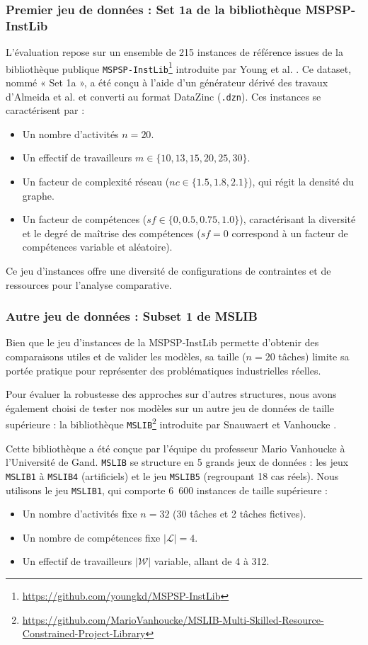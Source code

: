 \subsubsection{Premier jeu de données : Set 1a de la bibliothèque MSPSP-InstLib}
L'évaluation repose sur un ensemble de 215 instances de référence issues de la bibliothèque publique \texttt{MSPSP-InstLib}\footnote{\url{https://github.com/youngkd/MSPSP-InstLib}} introduite par Young et al. \cite{young2017constraint}. Ce dataset, nommé « Set 1a », a été conçu à l'aide d'un générateur dérivé des travaux d'Almeida et al. \cite{almeida2019modeling} et converti au format DataZinc (\texttt{.dzn}). Ces instances se caractérisent par :
\begin{itemize}
    \item Un nombre d'activités $n = 20$.
    \item Un effectif de travailleurs $m \in \{10, 13, 15, 20, 25, 30\}$.
    \item Un facteur de complexité réseau ($nc \in \{1.5, 1.8, 2.1\}$), qui régit la densité du graphe.
    \item Un facteur de compétences ($sf \in \{0, 0.5, 0.75, 1.0\}$), caractérisant la diversité et le degré de maîtrise des compétences ($sf=0$ correspond à un facteur de compétences variable et aléatoire).
\end{itemize}
Ce jeu d'instances offre une diversité de configurations de contraintes et de ressources pour l'analyse comparative.

\subsubsection{Autre jeu de données : Subset 1 de MSLIB}

Bien que le jeu d'instances de la MSPSP-InstLib permette d'obtenir des comparaisons utiles et de valider les modèles, sa taille ($n = 20$ tâches) limite sa portée pratique pour représenter des problématiques industrielles réelles.

Pour évaluer la robustesse des approches sur d'autres structures, nous avons également choisi de tester nos modèles sur un autre jeu de données de taille supérieure : la bibliothèque \texttt{MSLIB}\footnote{\url{https://github.com/MarioVanhoucke/MSLIB-Multi-Skilled-Resource-Constrained-Project-Library}} introduite par Snauwaert et Vanhoucke \cite{snauwaert2023classification}.

Cette bibliothèque a été conçue par l'équipe du professeur Mario Vanhoucke à l'Université de Gand. \texttt{MSLIB} se structure en 5 grands jeux de données : les jeux \texttt{MSLIB1} à \texttt{MSLIB4} (artificiels) et le jeu \texttt{MSLIB5} (regroupant 18 cas réels). Nous utilisons le jeu \texttt{MSLIB1}, qui comporte 6~600 instances de taille supérieure :
\begin{itemize}
    \item Un nombre d'activités fixe $n = 32$ (30 tâches et 2 tâches fictives).
    \item Un nombre de compétences fixe $|\mathcal{L}| = 4$.
    \item Un effectif de travailleurs $|\mathcal{W}|$ variable, allant de 4 à 312.
\end{itemize}


